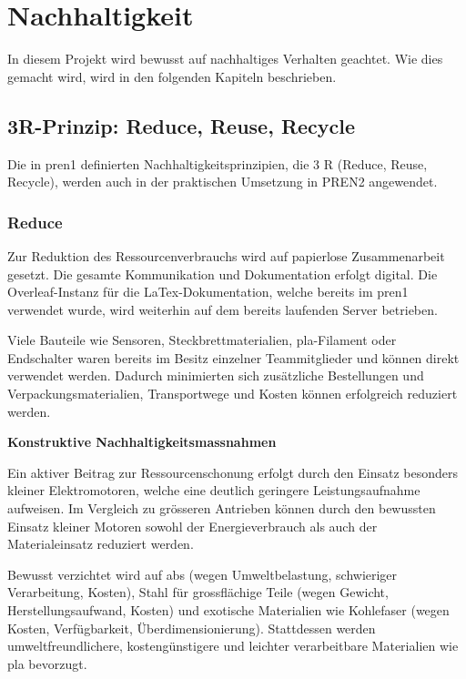 \section{Nachhaltigkeit}
\label{nachhaltigkeit}

In diesem Projekt wird bewusst auf nachhaltiges Verhalten geachtet. Wie dies gemacht wird, wird in den folgenden Kapiteln beschrieben.

\subsection{3R-Prinzip: Reduce, Reuse, Recycle}

Die in \acrshort{pren1} definierten Nachhaltigkeitsprinzipien, die 3 R (Reduce, Reuse, Recycle), werden auch in der praktischen Umsetzung in PREN2 angewendet.  

\subsubsection{Reduce}

Zur Reduktion des Ressourcenverbrauchs wird auf papierlose Zusammenarbeit gesetzt. Die gesamte Kommunikation und Dokumentation erfolgt digital. Die Overleaf-Instanz für die LaTex-Dokumentation, welche bereits im \acrshort{pren1} verwendet wurde, wird weiterhin auf dem bereits laufenden Server betrieben.

Viele Bauteile wie Sensoren, Steckbrettmaterialien, \acrshort{pla}-Filament oder Endschalter waren bereits im Besitz einzelner Teammitglieder und können direkt verwendet werden. Dadurch minimierten sich zusätzliche Bestellungen und Verpackungsmaterialien, Transportwege und Kosten können erfolgreich reduziert werden.

\textbf{Konstruktive Nachhaltigkeitsmassnahmen}

Ein aktiver Beitrag zur Ressourcenschonung erfolgt durch den Einsatz besonders kleiner Elektromotoren, welche eine deutlich geringere Leistungsaufnahme aufweisen. Im Vergleich zu grösseren Antrieben können durch den bewussten Einsatz kleiner Motoren sowohl der Energieverbrauch als auch der Materialeinsatz reduziert werden. 

Bewusst verzichtet wird auf \acrshort{abs} (wegen Umweltbelastung, schwieriger Verarbeitung, Kosten), Stahl für grossflächige Teile (wegen Gewicht, Herstellungsaufwand, Kosten) und exotische Materialien wie Kohlefaser (wegen Kosten, Verfügbarkeit, Überdimensionierung). Stattdessen werden umweltfreundlichere, kostengünstigere und leichter verarbeitbare Materialien wie \acrshort{pla} bevorzugt.\cite{pla}



